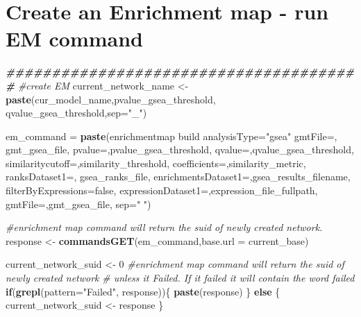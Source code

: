 \documentclass[
]{book}
\newenvironment{Shaded}{\begin{snugshade}}{\end{snugshade}}
\newcommand{\AttributeTok}[1]{\textcolor[rgb]{0.13,0.29,0.53}{#1}}
\newcommand{\CommentTok}[1]{\textcolor[rgb]{0.56,0.35,0.01}{\textit{#1}}}
\newcommand{\ControlFlowTok}[1]{\textcolor[rgb]{0.13,0.29,0.53}{\textbf{#1}}}
\newcommand{\DecValTok}[1]{\textcolor[rgb]{0.00,0.00,0.81}{#1}}
\newcommand{\DocumentationTok}[1]{\textcolor[rgb]{0.56,0.35,0.01}{\textbf{\textit{#1}}}}
\newcommand{\FunctionTok}[1]{\textcolor[rgb]{0.13,0.29,0.53}{\textbf{#1}}}
\newcommand{\NormalTok}[1]{#1}
\newcommand{\OtherTok}[1]{\textcolor[rgb]{0.56,0.35,0.01}{#1}}
\newcommand{\StringTok}[1]{\textcolor[rgb]{0.31,0.60,0.02}{#1}}
\begin{document}
\hypertarget{create-an-enrichment-map---run-em-command-1}{%
\section{Create an Enrichment map - run EM command}\label{create-an-enrichment-map---run-em-command-1}}

\begin{Shaded}
\begin{Highlighting}[]
\DocumentationTok{\#\#\#\#\#\#\#\#\#\#\#\#\#\#\#\#\#\#\#\#\#\#\#\#\#\#\#\#\#\#\#\#\#\#\#\#\#\#\#}
\CommentTok{\#create EM}
\NormalTok{current\_network\_name }\OtherTok{\textless{}{-}} \FunctionTok{paste}\NormalTok{(cur\_model\_name,pvalue\_gsea\_threshold,}
\NormalTok{                              qvalue\_gsea\_threshold,}\AttributeTok{sep=}\StringTok{"\_"}\NormalTok{)}

\NormalTok{em\_command }\OtherTok{=} \FunctionTok{paste}\NormalTok{(}\StringTok{\textquotesingle{}enrichmentmap build analysisType="gsea" gmtFile=\textquotesingle{}}\NormalTok{,}
\NormalTok{                                                              gmt\_gsea\_file,}
                   \StringTok{\textquotesingle{}pvalue=\textquotesingle{}}\NormalTok{,pvalue\_gsea\_threshold, }
                   \StringTok{\textquotesingle{}qvalue=\textquotesingle{}}\NormalTok{,qvalue\_gsea\_threshold,}
                   \StringTok{\textquotesingle{}similaritycutoff=\textquotesingle{}}\NormalTok{,similarity\_threshold,}
                   \StringTok{\textquotesingle{}coefficients=\textquotesingle{}}\NormalTok{,similarity\_metric,}
                   \StringTok{\textquotesingle{}ranksDataset1=\textquotesingle{}}\NormalTok{, gsea\_ranks\_file,}
                   \StringTok{\textquotesingle{}enrichmentsDataset1=\textquotesingle{}}\NormalTok{,gsea\_results\_filename, }
                   \StringTok{\textquotesingle{}filterByExpressions=false\textquotesingle{}}\NormalTok{,}
                   \StringTok{\textquotesingle{}expressionDataset1=\textquotesingle{}}\NormalTok{,expression\_file\_fullpath,}
                   \StringTok{\textquotesingle{}gmtFile=\textquotesingle{}}\NormalTok{,gmt\_gsea\_file,}
                   \AttributeTok{sep=}\StringTok{" "}\NormalTok{)}

\CommentTok{\#enrichment map command will return the suid of newly created network.}
\NormalTok{response }\OtherTok{\textless{}{-}} \FunctionTok{commandsGET}\NormalTok{(em\_command,}\AttributeTok{base.url =}\NormalTok{ current\_base)}

\NormalTok{current\_network\_suid }\OtherTok{\textless{}{-}} \DecValTok{0}
\CommentTok{\#enrichment map command will return the suid of newly created network }
\CommentTok{\# unless it Failed.  If it failed it will contain the word failed}
\ControlFlowTok{if}\NormalTok{(}\FunctionTok{grepl}\NormalTok{(}\AttributeTok{pattern=}\StringTok{"Failed"}\NormalTok{, response))\{}
  \FunctionTok{paste}\NormalTok{(response)}
\NormalTok{\} }\ControlFlowTok{else}\NormalTok{ \{}
\NormalTok{  current\_network\_suid }\OtherTok{\textless{}{-}}\NormalTok{ response}
\NormalTok{\}}


\end{Highlighting}
\end{Shaded}
\end{document}
